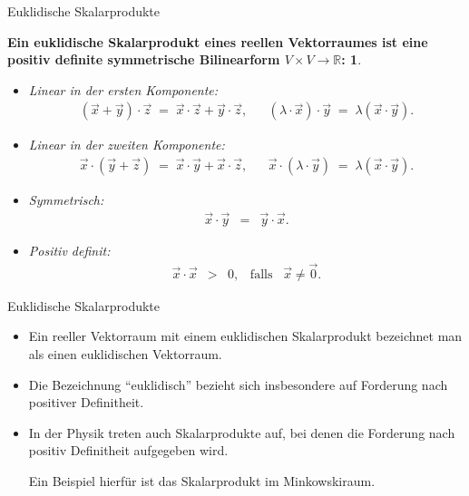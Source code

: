 \documentclass[german]{beamer}
\newcommand{\bq}{\begin{eqnarray*}}
\newcommand{\eq}{\end{eqnarray*}}
\newtheorem*{mytheorem9}{Ein euklidische Skalarprodukt eines reellen Vektorraumes ist eine positiv definite symmetrische Bilinearform $V \times V \rightarrow {\mathbb R}$:}
\begin{document}
\begin{frame}{Euklidische Skalarprodukte}

\begin{mytheorem9}
\begin{itemize}
\item Linear in der ersten Komponente:
{\small
\bq
 \left( \vec{x} + \vec{y} \right) \cdot \vec{z} 
 \; = \; \vec{x} \cdot \vec{z} + \vec{y} \cdot \vec{z},
 & &
 \left( \lambda \cdot \vec{x} \right) \cdot \vec{y} \; = \; \lambda \left( \vec{x} \cdot \vec{y} \right).
\eq
}
\item Linear in der zweiten Komponente:
{\small
\bq
 \vec{x} \cdot \left( \vec{y} + \vec{z} \right)  
 \; = \; \vec{x} \cdot \vec{y} + \vec{x} \cdot \vec{z},
 & &
 \vec{x} \cdot \left( \lambda \cdot \vec{y} \right) \; = \; \lambda \left( \vec{x} \cdot \vec{y} \right).
\eq
}
\item Symmetrisch:
{\small
\bq
 \vec{x} \cdot \vec{y} & = & \vec{y} \cdot \vec{x}.
\eq
}
\item Positiv definit:
{\small
\bq
 \vec{x} \cdot \vec{x} & > & 0, \;\;\;\mbox{falls}\;\;\; \vec{x} \neq \vec{0}.
\eq
}
\end{itemize}
\end{mytheorem9}

\end{frame}

\begin{frame}{Euklidische Skalarprodukte}

\begin{itemize}

\item 
Ein reeller Vektorraum mit einem euklidischen Skalarprodukt bezeichnet man als einen euklidischen Vektorraum.

\item 
Die Bezeichnung ``euklidisch'' bezieht sich insbesondere auf Forderung nach positiver Definitheit.

\item
In der Physik treten auch Skalarprodukte auf, bei denen die Forderung nach positiv Definitheit aufgegeben wird.

Ein Beispiel hierf\"ur ist das Skalarprodukt im Minkowskiraum.

\end{itemize}

\end{frame}
\end{document}
